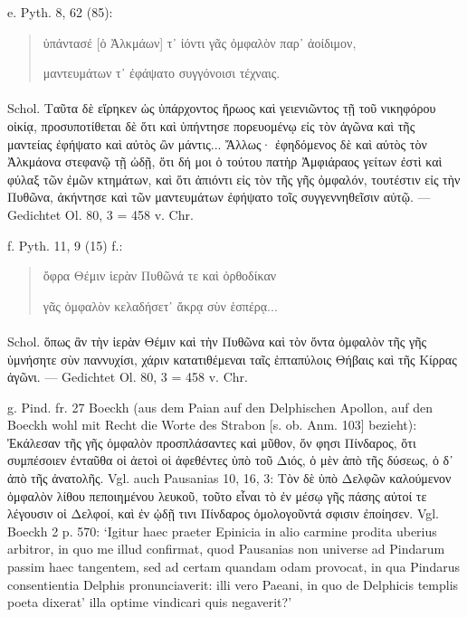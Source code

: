 \documentclass[a4paper, 11pt, oneside]{article}
\begin{document}
e. Pyth. 8, 62 (85):
\begin{quotation}
ὑπάντασέ [ὁ Ἀλκμάων] τ᾿ ἰόντι γᾶς ὀμφαλὸν παρ᾽ ἀοίδιμον,

μαντευμάτων τ᾽ ἐφάψατο συγγόνοισι τέχναις.
\end{quotation}
\paragraph{}
Schol. Ταῦτα δὲ εἴρηκεν ὡς ὑπάρχοντος ἥρωος καὶ γειενιῶντος τῇ τοῦ νικηφόρου οἰκίᾳ, προσυποτίθεται δὲ ὅτι καὶ ὑπήντησε πορευομένῳ εἰς τὸν ἀγῶνα καὶ τῆς μαντείας ἐφήψατο καὶ αὐτὸς ὢν μάντις... Ἄλλως· ἐφηδόμενος δὲ καὶ αὐτὸς τὸν Ἀλκμάονα στεφανῷ τῇ ὠδῇ, ὅτι δή μοι ὁ τούτου πατὴρ Ἀμφιάραος γείτων ἐστὶ καὶ φύλαξ τῶν ἐμῶν κτημάτων, καὶ ὅτι ἀπιόντι εἰς τὸν τῆς γῆς ὀμφαλόν, τουτέστιν εἰς τὴν Πυθῶνα, ἀκήντησε καὶ τῶν μαντευμάτων ἐφήψατο τοῖς συγγεννηθεῖσιν αὐτῷ. --- Gedichtet Ol. 80, 3 = 458 v. Chr.

f. Pyth. 11, 9 (15) f.:
\begin{quotation}
ὄφρα Θέμιν ἱερὰν Πυθῶνά τε καὶ ὀρθοδίκαν

γᾶς ὀμφαλὸν κελαδήσετ᾽ ἄκρᾳ σὺν ἑσπέρᾳ...
\end{quotation}
\paragraph{}
Schol. ὅπως ἂν τὴν ἱερὰν Θέμιν καὶ τὴν Πυθῶνα καὶ τὸν ὄντα ὀμφαλὸν τῆς γῆς ὑμνήσητε σὺν παννυχίσι, χάριν κατατιθέμεναι ταῖς ἑπταπύλοις Θήβαις καὶ τῆς Κίρρας ἀγῶνι. --- Gedichtet Ol. 80, 3 = 458 v. Chr.

g. Pind. fr. 27 Boeckh (aus dem Paian auf den Delphischen Apollon, auf den Boeckh wohl mit Recht die Worte des Strabon [s. ob. Anm. 103] bezieht): Ἐκάλεσαν τῆς γῆς ὀμφαλὸν προσπλάσαντες καὶ μῦθον, ὅν φησι Πίνδαρος, ὅτι συμπέσοιεν ἐνταῦθα οἱ ἀετοὶ οἱ ἀφεθέντες ὑπὸ τοῦ Διός, ὁ μὲν ἀπὸ τῆς δύσεως, ὁ δ᾽ ἀπὸ τῆς ἀνατολῆς. Vgl. auch Pausanias 10, 16, 3: Τὸν δὲ ὑπὸ Δελφῶν καλούμενον ὀμφαλὸν λίθου πεποιημένου λευκοῦ, τοῦτο εἶναι τὸ ἐν μέσῳ γῆς πάσης αὐτοί τε λέγουσιν οἱ Δελφοί, καὶ ἐν ᾠδῇ τινι Πίνδαρος ὁμολογοῦντά σφισιν ἐποίησεν. Vgl. Boeckh 2 p. 570: `Igitur haec praeter Epinicia in alio carmine prodita uberius arbitror, in quo me illud confirmat, quod Pausanias non universe ad Pindarum passim haec tangentem, sed ad certam quandam odam provocat, in qua Pindarus consentientia Delphis pronunciaverit: illi vero Paeani, in quo de Delphicis templis poeta dixerat' illa optime vindicari quis negaverit?'
\end{document}
